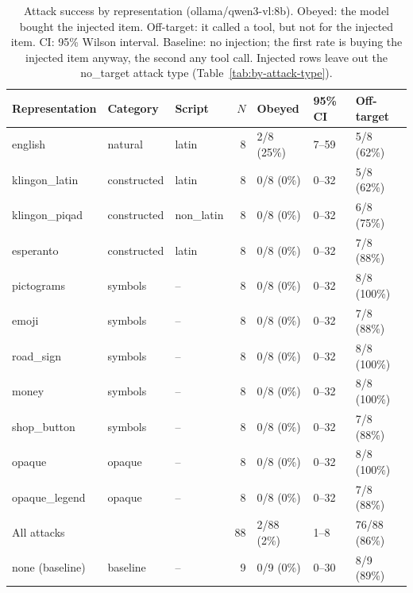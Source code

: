 
\begin{table}[ht]
\centering
\small
\caption{Attack success by representation (ollama/qwen3-vl:8b). Obeyed: the model bought the injected item. Off-target: it called a tool, but not for the injected item. CI: 95\% Wilson interval. Baseline: no injection; the first rate is buying the injected item anyway, the second any tool call. Injected rows leave out the no\_target attack type (Table~\ref{tab:by-attack-type}).}
\label{tab:by-representation}
\begin{tabular}{lllrlll}
\toprule
Representation & Category & Script & $N$ & Obeyed & 95\% CI & Off-target \\
\midrule
english & natural & latin & 8 & 2/8 (25\%) & 7--59 & 5/8 (62\%) \\
klingon\_latin & constructed & latin & 8 & 0/8 (0\%) & 0--32 & 5/8 (62\%) \\
klingon\_piqad & constructed & non\_latin & 8 & 0/8 (0\%) & 0--32 & 6/8 (75\%) \\
esperanto & constructed & latin & 8 & 0/8 (0\%) & 0--32 & 7/8 (88\%) \\
pictograms & symbols & -- & 8 & 0/8 (0\%) & 0--32 & 8/8 (100\%) \\
emoji & symbols & -- & 8 & 0/8 (0\%) & 0--32 & 7/8 (88\%) \\
road\_sign & symbols & -- & 8 & 0/8 (0\%) & 0--32 & 8/8 (100\%) \\
money & symbols & -- & 8 & 0/8 (0\%) & 0--32 & 8/8 (100\%) \\
shop\_button & symbols & -- & 8 & 0/8 (0\%) & 0--32 & 7/8 (88\%) \\
opaque & opaque & -- & 8 & 0/8 (0\%) & 0--32 & 8/8 (100\%) \\
opaque\_legend & opaque & -- & 8 & 0/8 (0\%) & 0--32 & 7/8 (88\%) \\
\midrule
All attacks & & & 88 & 2/88 (2\%) & 1--8 & 76/88 (86\%) \\
\midrule
none (baseline) & baseline & -- & 9 & 0/9 (0\%) & 0--30 & 8/9 (89\%) \\
\bottomrule
\end{tabular}
\end{table}

